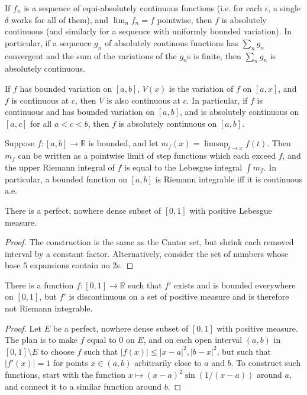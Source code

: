 \documentclass[letterpaper,11pt]{report}
\begin{document}
\begin{prop} If $f_n$ is a sequence of equi-absolutely continuous functions (i.e. for each $\epsilon$, a single $\delta$ works for all of them), and $\lim_n f_n = f$ pointwise, then $f$ is absolutely continuous (and similarly for a sequence with uniformly bounded variation). In particular, if a sequence $g_n$ of absolutely continous functions has $\sum_n g_n$ convergent and the sum of the variations of the $g_n$s is finite, then $\sum_n g_n$ is absolutely continuous.
\end{prop}

\begin{prop} If $f$ has bounded variation on $[a,b]$, $V(x)$ is the variation of $f$ on $[a,x]$, and $f$ is continuous at $c$, then $V$ is also continuous at $c$. In particular, if $f$ is continuous and has bounded variation on $[a,b]$, and is absolutely continuous on $[a,c]$ for all $a<c<b$, then $f$ is absolutely continuous on $[a,b]$.
\end{prop}

\begin{prop} Suppose $f:[a,b] \rightarrow \mathbb{R}$ is bounded, and let $m_f(x) = \limsup_{t\rightarrow x} f(t)$. Then $m_f$ can be written as a pointwise limit of step functions which each exceed $f$, and the upper Riemann integral of $f$ is equal to the Lebesgue integral $\int m_f$. In particular, a bounded function on $[a,b]$ is Riemann integrable iff it is continuous a.e.
\end{prop}

\begin{prop} There is a perfect, nowhere dense subset of $[0,1]$ with positive Lebesgue measure.
\end{prop}
\begin{proof} The construction is the same as the Cantor set, but shrink each removed interval by a constant factor. Alternatively, consider the set of numbers whose base $5$ expansions contain no $2$s.
\end{proof}

\begin{prop} There is a function $f:[0,1] \rightarrow \mathbb{R}$ such that $f'$ exists and is bounded everywhere on $[0,1]$, but $f'$ is discontinuous on a set of positive measure and is therefore not Riemann integrable.
\end{prop}
\begin{proof} Let $E$ be a perfect, nowhere dense subset of $[0,1]$ with positive measure. The plan is to make $f$ equal to $0$ on $E$, and on each open interval $(a,b)$ in $[0,1]\setminus E$ to choose $f$ such that $|f(x)| \le |x-a|^2, |b-x|^2$, but such that $|f'(x)| = 1$ for points $x \in (a,b)$ arbitrarily close to $a$ and $b$. To construct such functions, start with the function $x \mapsto (x-a)^2\sin(1/(x-a))$ around $a$, and connect it to a similar function around $b$.
\end{proof}
\end{document}

